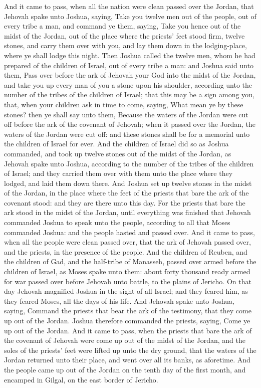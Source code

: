 And it came to pass, when all the nation were clean passed over the Jordan, that Jehovah spake unto Joshua, saying, Take you twelve men out of the people, out of every tribe a man, and command ye them, saying, Take you hence out of the midst of the Jordan, out of the place where the priests’ feet stood firm, twelve stones, and carry them over with you, and lay them down in the lodging-place, where ye shall lodge this night. Then Joshua called the twelve men, whom he had prepared of the children of Israel, out of every tribe a man: and Joshua said unto them, Pass over before the ark of Jehovah your God into the midst of the Jordan, and take you up every man of you a stone upon his shoulder, according unto the number of the tribes of the children of Israel; that this may be a sign among you, that, when your children ask in time to come, saying, What mean ye by these stones? then ye shall say unto them, Because the waters of the Jordan were cut off before the ark of the covenant of Jehovah; when it passed over the Jordan, the waters of the Jordan were cut off: and these stones shall be for a memorial unto the children of Israel for ever.  And the children of Israel did so as Joshua commanded, and took up twelve stones out of the midst of the Jordan, as Jehovah spake unto Joshua, according to the number of the tribes of the children of Israel; and they carried them over with them unto the place where they lodged, and laid them down there. And Joshua set up twelve stones in the midst of the Jordan, in the place where the feet of the priests that bare the ark of the covenant stood: and they are there unto this day. For the priests that bare the ark stood in the midst of the Jordan, until everything was finished that Jehovah commanded Joshua to speak unto the people, according to all that Moses commanded Joshua: and the people hasted and passed over. And it came to pass, when all the people were clean passed over, that the ark of Jehovah passed over, and the priests, in the presence of the people. And the children of Reuben, and the children of Gad, and the half-tribe of Manasseh, passed over armed before the children of Israel, as Moses spake unto them: about forty thousand ready armed for war passed over before Jehovah unto battle, to the plains of Jericho. On that day Jehovah magnified Joshua in the sight of all Israel; and they feared him, as they feared Moses, all the days of his life.  And Jehovah spake unto Joshua, saying, Command the priests that bear the ark of the testimony, that they come up out of the Jordan. Joshua therefore commanded the priests, saying, Come ye up out of the Jordan. And it came to pass, when the priests that bare the ark of the covenant of Jehovah were come up out of the midst of the Jordan, and the soles of the priests’ feet were lifted up unto the dry ground, that the waters of the Jordan returned unto their place, and went over all its banks, as aforetime.  And the people came up out of the Jordan on the tenth day of the first month, and encamped in Gilgal, on the east border of Jericho. 